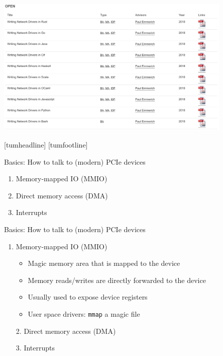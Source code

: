 \documentclass[NET,english,aspectratio=169,notitleframe]{tumbeamer}
\begin{document}
\begin{frame}{}
\centering\includegraphics[width=0.85\textwidth]{pics/theses}
\end{frame}
[tumheadline]
[tumfootline]


\begin{frame}{Basics: How to talk to (modern) PCIe devices}
\begin{enumerate}
\item Memory-mapped IO (MMIO)
\item Direct memory access (DMA)
\item Interrupts
\end{enumerate}
\end{frame}

\begin{frame}{Basics: How to talk to (modern) PCIe devices}
\begin{enumerate}
\item Memory-mapped IO (MMIO)
\begin{itemize}
\item Magic memory area that is mapped to the device
\item Memory reads/writes are directly forwarded to the device
\item Usually used to expose device registers
\item User space drivers: \texttt{mmap} a magic file
\end{itemize}
\item[\color{TUMLightGray}2.] {\color{TUMLightGray} Direct memory access (DMA)}
\item[\color{TUMLightGray}3.] {\color{TUMLightGray} Interrupts}
\end{enumerate}
\end{frame}
\end{document}
